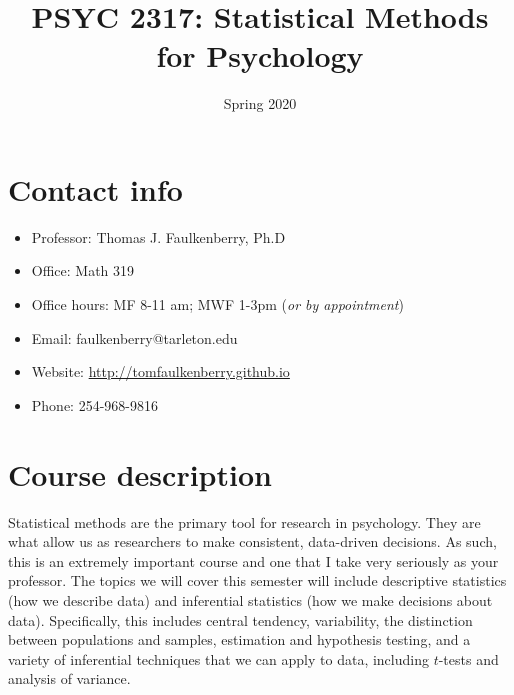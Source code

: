 \documentclass[10pt]{article}
\date{Spring 2020}
\title{PSYC 2317: Statistical Methods for Psychology}
\begin{document}
\maketitle

\section*{Contact info}
\label{sec:orgc3d2b83}
\begin{itemize}
\item Professor: Thomas J. Faulkenberry, Ph.D
\item Office: Math 319
\item Office hours: MF 8-11 am; MWF 1-3pm (\emph{or by appointment})
\item Email: faulkenberry@tarleton.edu
\item Website: \url{http://tomfaulkenberry.github.io}
\item Phone: 254-968-9816
\end{itemize}

\section*{Course description}
\label{sec:orge876788}

Statistical methods are the primary tool for research in psychology. They are what allow us as researchers to make consistent, data-driven decisions.  As such, this is an extremely important course and one that I take very seriously as your professor. The topics we will cover this semester will include descriptive statistics (how we describe data) and inferential statistics (how we make decisions about data).  Specifically, this includes central tendency, variability, the distinction between populations and samples, estimation and hypothesis testing, and a variety of inferential techniques that we can apply to data, including \(t\)-tests and analysis of variance.
\end{document}
